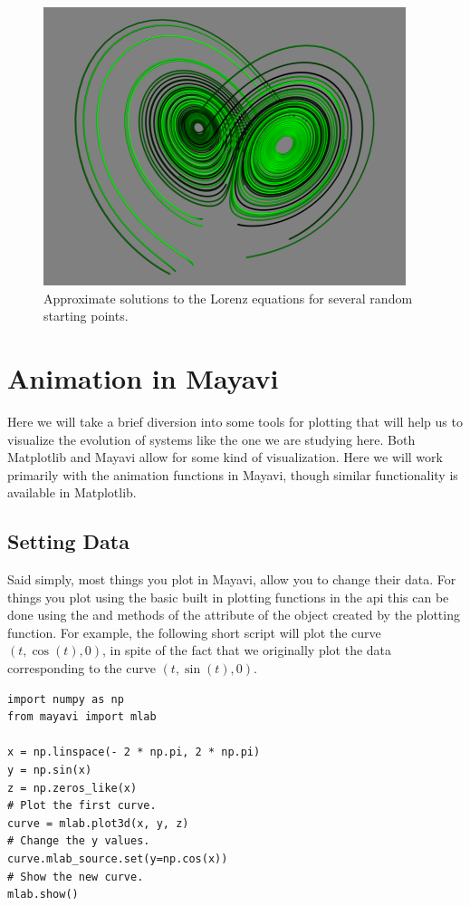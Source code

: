 \begin{figure}
\includegraphics[width=\textwidth]{lorenz_plot.png}
\caption{Approximate solutions to the Lorenz equations for several random starting points.}
\label{fig:lorenz_plot}
\end{figure}

\section*{Animation in Mayavi}
Here we will take a brief diversion into some tools for plotting that will help us to visualize the evolution of systems like the one we are studying here.
Both Matplotlib and Mayavi allow for some kind of visualization.
Here we will work primarily with the animation functions in Mayavi, though similar functionality is available in Matplotlib.

\subsection*{Setting Data}
Said simply, most things you plot in Mayavi, allow you to change their data.
For things you plot using the basic built in plotting functions in the  api this can be done using the  and  methods of the  attribute of the object created by the plotting function.
For example, the following short script will plot the curve $(t, \cos(t), 0)$, in spite of the fact that we originally plot the data corresponding to the curve $(t, \sin(t), 0)$.
\begin{lstlisting}
import numpy as np
from mayavi import mlab

x = np.linspace(- 2 * np.pi, 2 * np.pi)
y = np.sin(x)
z = np.zeros_like(x)
# Plot the first curve.
curve = mlab.plot3d(x, y, z)
# Change the y values.
curve.mlab_source.set(y=np.cos(x))
# Show the new curve.
mlab.show()
\end{lstlisting}

